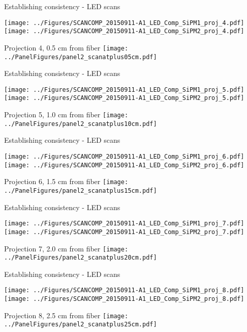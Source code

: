 \documentclass[compress,8pt]{beamer} %
\begin{document}
\begin{frame}{Establishing consistency - LED scans}
\begin{adjustwidth}{-2em}{-2em}
\texttt{[image: ../Figures/SCANCOMP\_20150911-A1\_LED\_Comp\_SiPM1\_proj\_4.pdf]}
\texttt{[image: ../Figures/SCANCOMP\_20150911-A1\_LED\_Comp\_SiPM2\_proj\_4.pdf]}
\end{adjustwidth}
Projection 4, 0.5 cm from fiber
\hfill \texttt{[image: ../PanelFigures/panel2\_scanatplus05cm.pdf]}
\end{frame}

\begin{frame}{Establishing consistency - LED scans}
\begin{adjustwidth}{-2em}{-2em}
\texttt{[image: ../Figures/SCANCOMP\_20150911-A1\_LED\_Comp\_SiPM1\_proj\_5.pdf]}
\texttt{[image: ../Figures/SCANCOMP\_20150911-A1\_LED\_Comp\_SiPM2\_proj\_5.pdf]}
\end{adjustwidth}
Projection 5, 1.0 cm from fiber
\hfill \texttt{[image: ../PanelFigures/panel2\_scanatplus10cm.pdf]}
\end{frame}

\begin{frame}{Establishing consistency - LED scans}
\begin{adjustwidth}{-2em}{-2em}
\texttt{[image: ../Figures/SCANCOMP\_20150911-A1\_LED\_Comp\_SiPM1\_proj\_6.pdf]}
\texttt{[image: ../Figures/SCANCOMP\_20150911-A1\_LED\_Comp\_SiPM2\_proj\_6.pdf]}
\end{adjustwidth}
Projection 6, 1.5 cm from fiber
\hfill \texttt{[image: ../PanelFigures/panel2\_scanatplus15cm.pdf]}
\end{frame}

\begin{frame}{Establishing consistency - LED scans}
\begin{adjustwidth}{-2em}{-2em}
\texttt{[image: ../Figures/SCANCOMP\_20150911-A1\_LED\_Comp\_SiPM1\_proj\_7.pdf]}
\texttt{[image: ../Figures/SCANCOMP\_20150911-A1\_LED\_Comp\_SiPM2\_proj\_7.pdf]}
\end{adjustwidth}
Projection 7, 2.0 cm from fiber
\hfill \texttt{[image: ../PanelFigures/panel2\_scanatplus20cm.pdf]}
\end{frame}

\begin{frame}{Establishing consistency - LED scans}
\begin{adjustwidth}{-2em}{-2em}
\texttt{[image: ../Figures/SCANCOMP\_20150911-A1\_LED\_Comp\_SiPM1\_proj\_8.pdf]}
\texttt{[image: ../Figures/SCANCOMP\_20150911-A1\_LED\_Comp\_SiPM2\_proj\_8.pdf]}
\end{adjustwidth}
Projection 8, 2.5 cm from fiber
\hfill \texttt{[image: ../PanelFigures/panel2\_scanatplus25cm.pdf]}
\end{frame}
\end{document}
